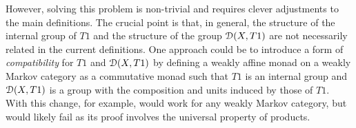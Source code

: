 \documentclass[a4paper,UKenglish,numberwithinsect,cleveref, autoref, thm-restate]{lipics-v2021}
\theoremstyle{plain} %
\theoremstyle{definition} %
\newtheorem{mydefinition}[mytheorem]{Definition}
\begin{document}
However, solving this problem is non-trivial and requires clever adjustments to the main definitions. The crucial point is that, in general, the structure of the internal group of $T1$ and the structure of the group $\mathcal{D}(X,T1)$ are not necessarily related in the current definitions. One approach could be to introduce a form of \emph{compatibility} for $T1$ and $\mathcal{D}(X,T1)$ by defining a weakly affine monad on a weakly Markov category as a commutative monad such that $T1$ is an internal group and $\mathcal{D}(X,T1)$ is a group with the composition and units induced by those of $T1$. With this change, for example,  would work for any weakly Markov category, but  would likely fail as its proof involves the universal property of products. 
\\
% 
% 
% 
\end{document}
